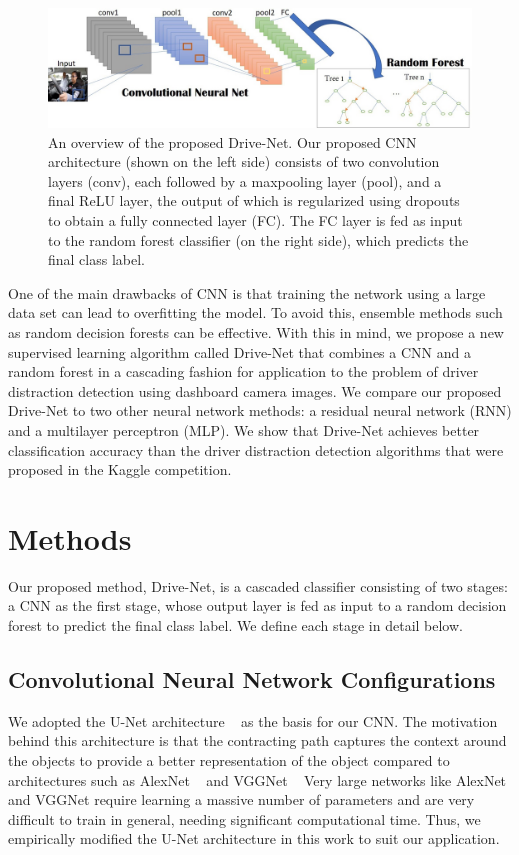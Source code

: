 \documentclass[conference,compsoc]{IEEEtran}
\begin{document}
\bgroup
\begin{figure}[!htbp]
\centering 
\includegraphics{Drive-Net/figures/image2.jpeg}
\caption{An overview of the proposed Drive-Net. Our proposed CNN architecture (shown on the left side) consists of two convolution layers (conv), each followed by a maxpooling layer (pool), and a final ReLU layer, the output of which is regularized using dropouts to obtain a fully connected layer (FC). The FC layer is fed as input to the random forest classifier (on the right side), which predicts the final class label.}
\label{Drive-Net/figure2}
\end{figure}
\egroup

One of the main drawbacks of CNN is that training the network using a large data set can lead to overfitting the model. To avoid this, ensemble methods such as random decision forests can be effective. With this in mind, we propose a new supervised learning algorithm called Drive-Net that combines a CNN and a random forest in a cascading fashion for application to the problem of driver distraction detection using dashboard camera images. We compare our proposed Drive-Net to two other neural network methods: a residual neural network (RNN) and a multilayer perceptron (MLP). We show that Drive-Net achieves better classification accuracy than the driver distraction detection algorithms that were proposed in the Kaggle competition. \unskip~\cite{1641075:26775858}
    
\section{Methods}
Our proposed method, Drive-Net, is a cascaded classifier consisting of two stages: a CNN as the first stage, whose output layer is fed as input to a random decision forest to predict the final class label. We define each stage in detail below.



\subsection{Convolutional Neural Network Configurations} We adopted the U-Net architecture \unskip~\cite{1641075:26775850} as the basis for our CNN. The motivation behind this architecture is that the contracting path captures the context around the objects to provide a better representation of the object compared to architectures such as AlexNet \unskip~\cite{1641075:26775852} and VGGNet \unskip~\cite{1641075:26775860} Very large networks like AlexNet and VGGNet require learning a massive number of parameters and are very difficult to train in general, needing significant computational time. Thus, we empirically modified the U-Net architecture in this work to suit our application.
\end{document}
